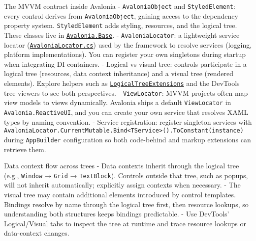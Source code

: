 The MVVM contract inside Avalonia -
\passthrough{\lstinline!AvaloniaObject!} and
\passthrough{\lstinline!StyledElement!}: every control derives from
\passthrough{\lstinline!AvaloniaObject!}, gaining access to the
dependency property system. \passthrough{\lstinline!StyledElement!} adds
styling, resources, and the logical tree. These classes live in
\href{https://github.com/AvaloniaUI/Avalonia/tree/master/src/Avalonia.Base}{\passthrough{\lstinline!Avalonia.Base!}}.
- \passthrough{\lstinline!AvaloniaLocator!}: a lightweight service
locator
(\href{https://github.com/AvaloniaUI/Avalonia/blob/master/src/Avalonia.Base/AvaloniaLocator.cs}{\passthrough{\lstinline!AvaloniaLocator.cs!}})
used by the framework to resolve services (logging, platform
implementations). You can register your own singletons during startup
when integrating DI containers. - Logical vs visual tree: controls
participate in a logical tree (resources, data context inheritance) and
a visual tree (rendered elements). Explore helpers such as
\href{https://github.com/AvaloniaUI/Avalonia/blob/master/src/Avalonia.Base/LogicalTree/LogicalTreeExtensions.cs}{\passthrough{\lstinline!LogicalTreeExtensions!}}
and the DevTools tree viewers to see both perspectives. -
\passthrough{\lstinline!ViewLocator!}: MVVM projects often map view
models to views dynamically. Avalonia ships a default
\passthrough{\lstinline!ViewLocator!} in
\passthrough{\lstinline!Avalonia.ReactiveUI!}, and you can create your
own service that resolves XAML types by naming convention. - Service
registration: register singleton services with
\passthrough{\lstinline!AvaloniaLocator.CurrentMutable.Bind<TService>().ToConstant(instance)!}
during \passthrough{\lstinline!AppBuilder!} configuration so both
code-behind and markup extensions can retrieve them.

Data context flow across trees - Data contexts inherit through the
logical tree (e.g., \passthrough{\lstinline!Window!} →
\passthrough{\lstinline!Grid!} → \passthrough{\lstinline!TextBlock!}).
Controls outside that tree, such as popups, will not inherit
automatically; explicitly assign contexts when necessary. - The visual
tree may contain additional elements introduced by control templates.
Bindings resolve by name through the logical tree first, then resource
lookups, so understanding both structures keeps bindings predictable. -
Use DevTools' Logical/Visual tabs to inspect the tree at runtime and
trace resource lookups or data-context changes.

